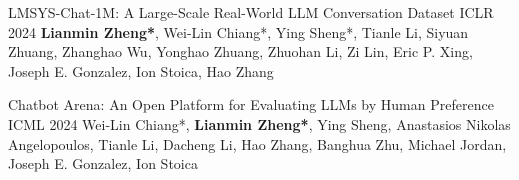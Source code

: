\begin{cventries}
\cventry
{}
{LMSYS-Chat-1M: A Large-Scale Real-World LLM Conversation Dataset} %
{ICLR 2024} %
{} %
{\textbf{Lianmin Zheng*}, Wei-Lin Chiang*, Ying Sheng*, Tianle Li, Siyuan Zhuang, Zhanghao Wu, Yonghao Zhuang, Zhuohan Li, Zi Lin, Eric P. Xing, Joseph E. Gonzalez, Ion Stoica, Hao Zhang}

\cventry
{}
{Chatbot Arena: An Open Platform for Evaluating LLMs by Human Preference} %
{ICML 2024} %
{} %
{Wei-Lin Chiang*, \textbf{Lianmin Zheng*}, Ying Sheng, Anastasios Nikolas Angelopoulos, Tianle Li, Dacheng Li, Hao Zhang, Banghua Zhu, Michael Jordan, Joseph E. Gonzalez, Ion Stoica}


\end{cventries}




